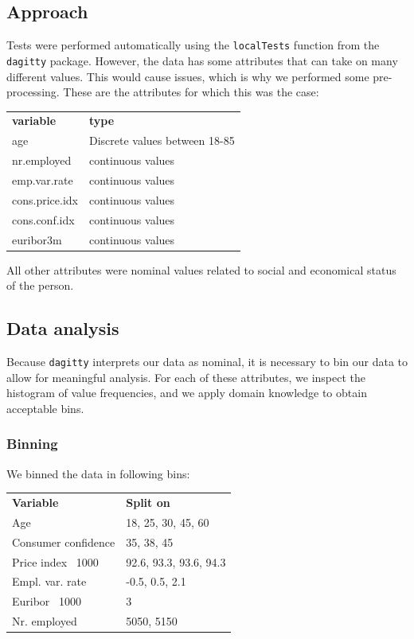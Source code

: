 \documentclass[11pt,]{article}
\begin{document}
\begin{multicols}{2}
\hypertarget{approach}{%
\subsection{Approach}\label{approach}}

Tests were performed automatically using the \texttt{localTests}
function from the \texttt{dagitty} package. However, the data has some
attributes that can take on many different values. This would cause
issues, which is why we performed some pre-processing. These are the
attributes for which this was the case:

\medskip
\begin{tabular}{ll}
    \textbf{variable} & \textbf{type} \\
    age & Discrete values between 18-85 \\
    nr.employed & continuous values \\
    emp.var.rate & continuous values \\
    cons.price.idx & continuous values \\
    cons.conf.idx & continuous values \\
    euribor3m & continuous values \\
\end{tabular}

\medskip

All other attributes were nominal values related to social and
economical status of the person.

\hypertarget{data-analysis}{%
\subsection{Data analysis}\label{data-analysis}}

Because \texttt{dagitty} interprets our data as nominal, it is necessary
to bin our data to allow for meaningful analysis. For each of these
attributes, we inspect the histogram of value frequencies, and we apply
domain knowledge to obtain acceptable bins.

\hypertarget{binning}{%
\subsubsection{Binning}\label{binning}}

We binned the data in following bins:

\medskip
\begin{tabular}{ll}
    \textbf{Variable}           & \textbf{Split on} \\
    Age                         & 18, 25, 30, 45, 60 \\
    Consumer confidence         & 35, 38, 45 \\
    Price index \ 1000          & 92.6, 93.3, 93.6, 94.3 \\
    Empl. var. rate             & -0.5, 0.5, 2.1 \\
    Euribor \ 1000              & 3 \\
    Nr. employed                & 5050, 5150 \\
\end{tabular}


\end{multicols}
\end{document}
